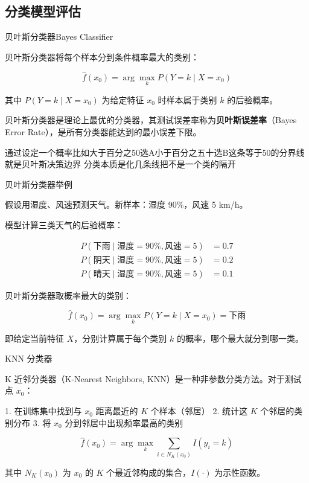 \subsection{分类模型评估}\begin{definition}{贝叶斯分类器Bayes Classifier}

贝叶斯分类器将每个样本分到条件概率最大的类别：

\[
\hat{f}(x_0) = \arg\max_k P(Y = k \mid X = x_0)
\]

其中 $P(Y = k \mid X = x_0)$ 为给定特征 $x_0$ 时样本属于类别 $k$ 的后验概率。

贝叶斯分类器是理论上最优的分类器，其测试误差率称为\textbf{贝叶斯误差率}（Bayes Error Rate），是所有分类器能达到的最小误差下限。

\end{definition}
\begin{dxtips}
   通过设定一个概率比如大于百分之50选A小于百分之五十选B这条等于50的分界线就是贝叶斯决策边界 分类本质是化几条线把不是一个类的隔开
\end{dxtips}
\begin{note}{贝叶斯分类器举例}

假设用湿度、风速预测天气。新样本：湿度 90\%，风速 5 km/h。

模型计算三类天气的后验概率：

\[
\begin{aligned}
P(\text{下雨} \mid \text{湿度}=90\%, \text{风速}=5) &= 0.7 \\
P(\text{阴天} \mid \text{湿度}=90\%, \text{风速}=5) &= 0.2 \\
P(\text{晴天} \mid \text{湿度}=90\%, \text{风速}=5) &= 0.1
\end{aligned}
\]

贝叶斯分类器取概率最大的类别：

\[
\hat{f}(x_0) = \arg\max_{k} P(Y = k \mid X = x_0) = \text{下雨}
\]

即给定当前特征 $X$，分别计算属于每个类别 $k$ 的概率，哪个最大就分到哪一类。

\end{note}
\begin{definition}{KNN 分类器}

K 近邻分类器（K-Nearest Neighbors, KNN）是一种非参数分类方法。对于测试点 $x_0$：

1. 在训练集中找到与 $x_0$ 距离最近的 $K$ 个样本（邻居）
2. 统计这 $K$ 个邻居的类别分布
3. 将 $x_0$ 分到邻居中出现频率最高的类别

\[
\hat{f}(x_0) = \arg\max_{k} \sum_{i \in N_K(x_0)} I(y_i = k)
\]

其中 $N_K(x_0)$ 为 $x_0$ 的 $K$ 个最近邻构成的集合，$I(\cdot)$ 为示性函数。

\end{definition}
